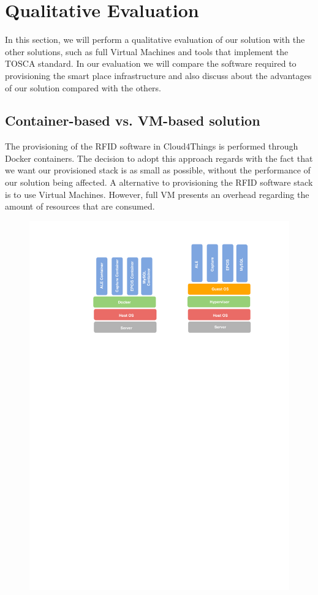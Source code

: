 \section{Qualitative Evaluation}
\label{sec:qualitative_evaluation}
In this section, we will perform a qualitative evaluation of our solution with the other solutions,
such as full Virtual Machines and tools that implement the TOSCA standard. In our evaluation we
will compare the software required to provisioning the smart place infrastructure and also discuss
about the advantages of our solution compared with the others.

\subsection{Container-based vs. VM-based solution}
\label{sub:container_vs_vm_solution}
The provisioning of the RFID software in Cloud4Things is performed through Docker containers. The
decision to adopt this approach regards with the fact that we want our provisioned stack is as
small as possible, without the performance of our solution being affected. A alternative to
provisioning the RFID software stack is to use Virtual Machines. However, full VM presents
an overhead regarding the amount of resources that are consumed.

\begin{figure}[!ht]
  \centering
  \includegraphics[width=.8\textwidth]{images/container-vs-vm-stack}
\end{figure}

